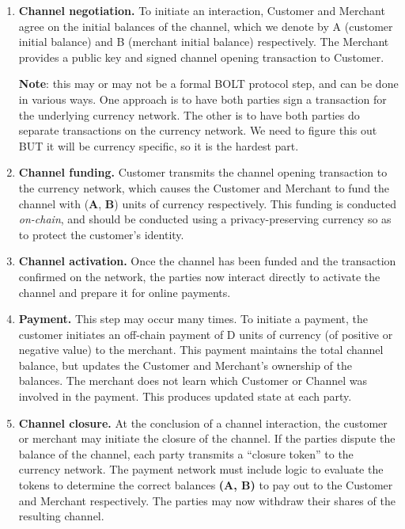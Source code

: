 \documentclass[11pt]{report}
\begin{document}
\begin{enumerate}
\item {\bf Channel negotiation.} To initiate an interaction, Customer and Merchant agree on the initial balances of the channel, which we denote by A (customer initial balance) and B (merchant initial balance) respectively. The Merchant provides a public key and signed channel opening transaction to Customer. 

{\bf Note}: this may or may not be a formal BOLT protocol step, and can be done in various ways. One approach is to have both parties sign a transaction for the underlying currency network. The other is to have both parties do separate transactions on the currency network. We need to figure this out BUT it will be currency specific, so it is the hardest part.

\item {\bf Channel funding.} Customer transmits the channel opening transaction to the currency network, which causes the Customer and Merchant to fund the channel with ({\bf A}, {\bf B}) units of currency respectively. This funding is conducted {\em on-chain}, and should be conducted using a privacy-preserving currency so as to protect the customer's identity.

\item {\bf Channel activation.} Once the channel has been funded and the transaction confirmed on the network, the parties now interact directly to activate the channel and prepare it for online payments. 

\item {\bf Payment.} This step may occur many times. To initiate a payment, the customer initiates an off-chain payment of D units of currency (of positive or negative value) to the merchant. This payment maintains the total channel balance, but updates the Customer and Merchant's ownership of the balances. The merchant does not learn which Customer or Channel was involved in the payment. This produces updated state at each party.

\item {\bf Channel closure.} At the conclusion of a channel interaction, the customer or merchant may initiate the closure of the channel. If the parties dispute the balance of the channel, each party transmits a ``closure token'' to the currency network. The payment network must include logic to evaluate the tokens to determine the correct balances {\bf (A,  B)} to pay out to the Customer and Merchant respectively. The parties may now withdraw their shares of the resulting channel.

\end{enumerate}
\end{document}

